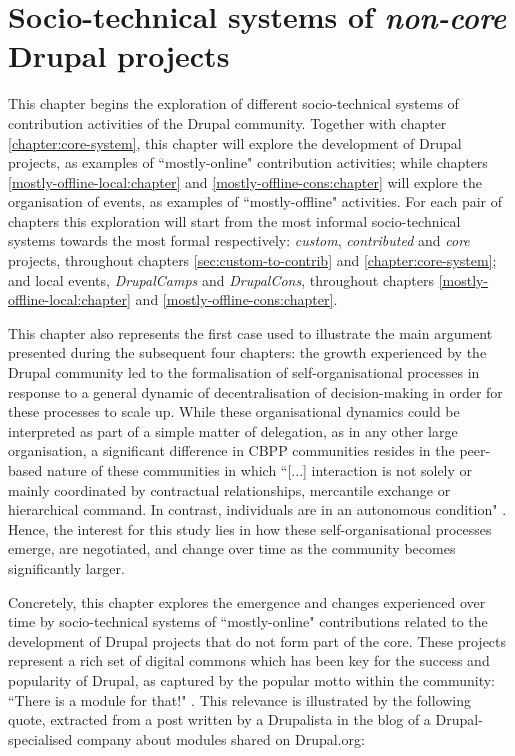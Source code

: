\chapter{Socio-technical systems of \textit{non-core} Drupal projects}
\label{sec:custom-to-contrib}

This chapter begins the exploration of different socio-technical systems of contribution activities of the Drupal community. Together with chapter \ref{chapter:core-system}, this chapter will explore the development of Drupal projects, as examples of  ``mostly-online" contribution activities; while chapters \ref{mostly-offline-local:chapter} and \ref{mostly-offline-cons:chapter} will explore the organisation of events, as examples of ``mostly-offline" activities. For each pair of chapters this exploration will start from the most informal socio-technical systems towards the most formal respectively: \textit{custom}, \textit{contributed} and \textit{core} projects, throughout chapters \ref{sec:custom-to-contrib} and \ref{chapter:core-system}; and local events, \textit{DrupalCamps} and \textit{DrupalCons}, throughout chapters \ref{mostly-offline-local:chapter} and \ref{mostly-offline-cons:chapter}.

This chapter also represents the first case used to illustrate the main argument presented during the subsequent four chapters: the growth experienced by the Drupal community led to the formalisation of self-organisational processes in response to a general dynamic of decentralisation of decision-making in order for these processes to scale up. While these organisational dynamics could be interpreted as part of a simple matter of delegation, as in any other large organisation, a significant difference in CBPP communities resides in the peer-based nature of these communities in which ``[...] interaction is not solely or mainly coordinated by contractual relationships, mercantile exchange or hierarchical command. In contrast, individuals are in an autonomous condition" \parencite[11]{p2pvalue-del12:Online}. Hence, the interest for this study lies in how these self-organisational processes emerge, are negotiated, and change over time as the community becomes significantly larger.

Concretely, this chapter explores the emergence and changes experienced over time by socio-technical systems of ``mostly-online" contributions related to the development of Drupal projects that do not form part of the core. These projects represent a rich set of digital commons which has been key for the success and popularity of Drupal, as captured by the popular motto within the community: ``There is a module for that!" \parencite{abbott2016learning}. This relevance is illustrated by the following quote, extracted from a post written by a Drupalista in the blog of a Drupal-specialised company about modules shared on Drupal.org:

